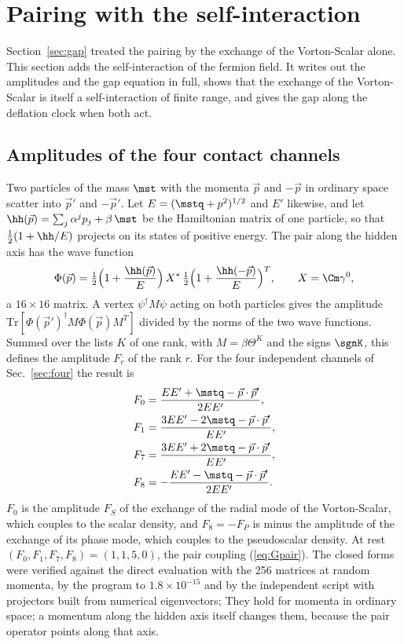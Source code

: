 \section{Pairing with the self-interaction}
\label{sec:gapcontact}

Section~\ref{sec:gap} treated the pairing by the exchange of the Vorton-Scalar alone. This section
adds the self-interaction of the fermion field. It writes out the amplitudes and the gap equation in
full, shows that the exchange of the Vorton-Scalar is itself a self-interaction of finite range, and
gives the gap along the deflation clock when both act.

\subsection{Amplitudes of the four contact channels}

Two particles of the mass $\mst$ with the momenta $\vec p$ and $-\vec p$ in ordinary space scatter
into $\vec p'$ and $-\vec p'$. Let $E=(\mstq+p^{2})^{1/2}$ and $E'$ likewise, and let
$\hh(\vec p)=\sum_j\alpha^{j}p_j+\beta\,\mst$ be the Hamiltonian matrix of one particle, so that
$\tfrac12(1+\hh/E)$ projects on its states of positive energy. The pair along the hidden axis has
the wave function
\begin{equation}
\Phi(\vec p)=\tfrac12\Big(1+\frac{\hh(\vec p)}{E}\Big)\,X^{*}\,\tfrac12\Big(1+\frac{\hh(-\vec p)}{E}\Big)^{T},\qquad X=\Cm\gamma^{0},
\end{equation}
a $16\times16$ matrix. A vertex $\psi^\dagger M\psi$ acting on both particles gives the amplitude
$\mathrm{Tr}[\Phi(\vec p')^\dagger M\Phi(\vec p)M^{T}]$ divided by the norms of the two wave
functions. Summed over the lists $K$ of one rank, with $M=\beta\Theta^{K}$ and the signs $\sgnK$, this
defines the amplitude $F_r$ of the rank $r$. For the four independent channels of
Sec.~\ref{sec:four} the result is
\begin{equation}
\begin{aligned}
F_0&=\frac{EE'+\mstq-\vec p\cdot\vec p'}{2EE'},\\
F_1&=\frac{3EE'-2\mstq-\vec p\cdot\vec p'}{EE'},\\
F_7&=\frac{3EE'+2\mstq-\vec p\cdot\vec p'}{EE'},\\
F_8&=-\frac{EE'-\mstq-\vec p\cdot\vec p'}{2EE'} .
\end{aligned}
\label{eq:Fclosed}
\end{equation}
$F_0$ is the amplitude $F_S$ of the exchange of the radial mode of the Vorton-Scalar, which couples
to the scalar density, and $F_8=-F_P$ is minus the amplitude of the exchange of its phase mode,
which couples to the pseudoscalar density. At rest $(F_0,F_1,F_7,F_8)=(1,1,5,0)$, the pair coupling
(\ref{eq:Gpair}). The closed forms were verified against the direct evaluation with the 256 matrices
at random momenta, by the program to $1.8\times10^{-15}$ and by the independent script with
projectors built from numerical eigenvectors;  They
hold for momenta in ordinary space; a momentum along the hidden axis itself changes them, because
the pair operator points along that axis.

